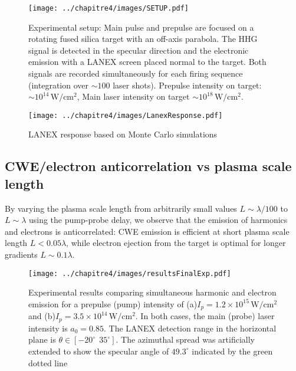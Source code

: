 \begin{figure}[H]
\centering
\texttt{[image: ../chapitre4/images/SETUP.pdf]}\\
\caption{\label{fig:SETUP} Experimental setup: Main pulse and prepulse are focused on a rotating fused silica target with an off-axis parabola. The HHG signal is detected in the specular direction and the electronic emission with a LANEX screen placed normal to the target. Both signals are recorded simultaneously for each firing sequence (integration over $\sim 100$ laser shots). Prepulse intensity on target:$\sim 10^{14}\,\mathrm{W/cm^2}$, Main laser intensity on target $\sim 10^{18}\,\mathrm{W/cm^2}$.}
\end{figure}

\begin{figure}[H]
\centering
\texttt{[image: ../chapitre4/images/LanexResponse.pdf]}\\
\caption{\label{fig:LanexResponse}LANEX response based on Monte Carlo simulations \cite{glinec2006absolute}}
\end{figure}



\subsection{CWE/electron anticorrelation vs plasma scale length}\label{subsub:CWE/electron anticorreleation with plasma scale length}

By varying the plasma scale length from arbitrarily small values $L\sim \lambda/100$ to $L\sim \lambda$ using the pump-probe delay, we observe that the emission of harmonics
and electrons is anticorrelated: CWE emission is efficient at short plasma scale length $L< 0.05 \lambda$, while electron ejection from the target is optimal for longer gradients $L\sim 0.1\lambda$.

\begin{figure}[H]
\centering
\texttt{[image: ../chapitre4/images/resultsFinalExp.pdf]}\\
\caption{\label{fig:resultsFinalExp} Experimental results comparing simultaneous harmonic and electron emission for a prepulse (pump) intensity of (a)$I_p = 1.2 \times 10^{15}\,\mathrm{W/cm^2}$ and (b)$I_p = 3.5\times 10^{14}\,\mathrm{W/cm^2}$. In both cases, the main (probe) laser intensity is $a_0 = 0.85$. The LANEX detection range in the horizontal plane is $\theta \in [-20^{\circ} \ \ 35^{\circ}]$. The azimuthal spread was artificially extended to show the specular angle of $49.3^{\circ}$ indicated by the green dotted line}
\end{figure}

